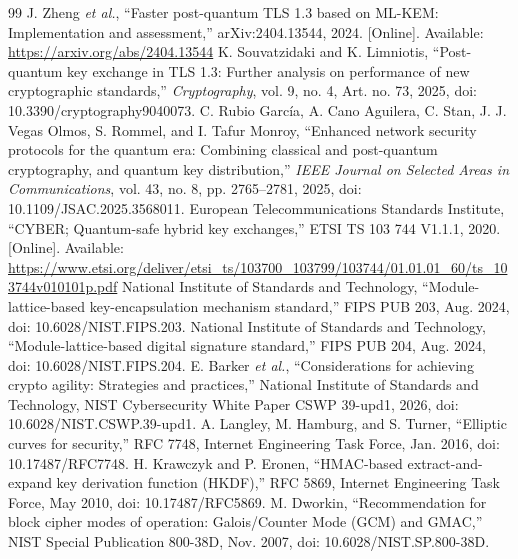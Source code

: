 \documentclass[journal]{IEEEtran}
\begin{document}
\begin{thebibliography}{99}
 J. Zheng \emph{et al.}, ``Faster post-quantum TLS 1.3 based on ML-KEM: Implementation and assessment,'' arXiv:2404.13544, 2024. [Online]. Available: \url{https://arxiv.org/abs/2404.13544}
 K. Souvatzidaki and K. Limniotis, ``Post-quantum key exchange in TLS 1.3: Further analysis on performance of new cryptographic standards,'' \emph{Cryptography}, vol. 9, no. 4, Art. no. 73, 2025, doi: 10.3390/cryptography9040073.
 C. Rubio Garc\'ia, A. Cano Aguilera, C. Stan, J. J. Vegas Olmos, S. Rommel, and I. Tafur Monroy, ``Enhanced network security protocols for the quantum era: Combining classical and post-quantum cryptography, and quantum key distribution,'' \emph{IEEE Journal on Selected Areas in Communications}, vol. 43, no. 8, pp. 2765--2781, 2025, doi: 10.1109/JSAC.2025.3568011.
 European Telecommunications Standards Institute, ``CYBER; Quantum-safe hybrid key exchanges,'' ETSI TS 103 744 V1.1.1, 2020. [Online]. Available: \url{https://www.etsi.org/deliver/etsi_ts/103700_103799/103744/01.01.01_60/ts_103744v010101p.pdf}
 National Institute of Standards and Technology, ``Module-lattice-based key-encapsulation mechanism standard,'' FIPS PUB 203, Aug. 2024, doi: 10.6028/NIST.FIPS.203.
 National Institute of Standards and Technology, ``Module-lattice-based digital signature standard,'' FIPS PUB 204, Aug. 2024, doi: 10.6028/NIST.FIPS.204.
 E. Barker \emph{et al.}, ``Considerations for achieving crypto agility: Strategies and practices,'' National Institute of Standards and Technology, NIST Cybersecurity White Paper CSWP 39-upd1, 2026, doi: 10.6028/NIST.CSWP.39-upd1.
 A. Langley, M. Hamburg, and S. Turner, ``Elliptic curves for security,'' RFC 7748, Internet Engineering Task Force, Jan. 2016, doi: 10.17487/RFC7748.
 H. Krawczyk and P. Eronen, ``HMAC-based extract-and-expand key derivation function (HKDF),'' RFC 5869, Internet Engineering Task Force, May 2010, doi: 10.17487/RFC5869.
 M. Dworkin, ``Recommendation for block cipher modes of operation: Galois/Counter Mode (GCM) and GMAC,'' NIST Special Publication 800-38D, Nov. 2007, doi: 10.6028/NIST.SP.800-38D.
\end{thebibliography}
\end{document}

